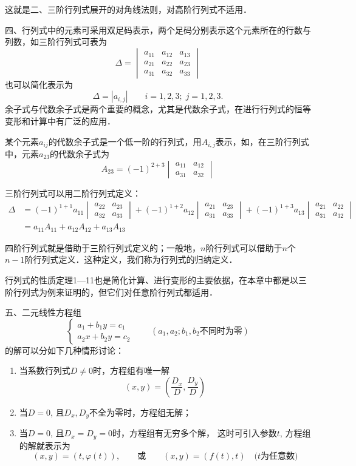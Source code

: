 这就是二、三阶行列式展开的对角线法则，对高阶行列式不适用．

四、行列式中的元素可采用双足码表示，两个足码分别表示这个元素所在的行数与列数，如三阶行列式可表为
\[\Delta =\begin{vmatrix}
    a_{11}&a_{12}&a_{13}\\a_{21}&a_{22}&a_{23}\\a_{31}&a_{32}&a_{33}
\end{vmatrix}\]
也可以简化表示为
\[\Delta =|a_{i,j}|\qquad i=1,2,3;\; j=1,2,3.\]
余子式与代数余子式是两个重要的概念，尤其是代数余子式，在进行行列式的恒等变形和计算中有广泛的应用．

某个元素$a_{ij}$的代数余子式是一个低一阶的行列式，用$A_{i,j}$表示，如，在三阶行列式中，元素$a_{23}$的代数余子式为
\[A_{23}=(-1)^{2+3}\begin{vmatrix}
    a_{11}&a_{12}\\a_{31}&a_{32}
\end{vmatrix}\]

三阶行列式可以用二阶行列式定义：
\[\begin{split}
\Delta&=(-1)^{1+1}a_{11}\begin{vmatrix}
    a_{22}&a_{23}\\a_{32}&a_{33}
\end{vmatrix}+(-1)^{1+2}a_{12}\begin{vmatrix}
    a_{21}&a_{23}\\a_{31}&a_{33}
\end{vmatrix}+(-1)^{1+3}a_{13}\begin{vmatrix}
    a_{21}&a_{22}\\a_{31}&a_{32}
\end{vmatrix}\\
&=a_{11}A_{11}+a_{12}A_{12}+a_{13}A_{13}
\end{split}\]

四阶行列式就是借助于三阶行列式定义的；一般地，$n$阶行列式可以借助于$n$个$n-1$阶行列式定义．这种定义，我们称为行列式的归纳定义．

行列式的性质定理1—11也是简化计算、进行变形的主要依据，在本章中都是以三阶行列式为例来证明的，但它们对任意阶行列式都适用．

五、二元线性方程组
\[\begin{cases}
    a_1+b_1y=c_1\\
    a_2x+b_2y=c_2
\end{cases}\qquad (\text{$a_1,a_2; b_1,b_2$不同时为零})\]
的解可以分如下几种情形讨论：
\begin{enumerate}
    \item 当系数行列式$D\ne 0$时，方程组有唯一解
\[(x,y)=\left(\frac{D_x}{D},\frac{D_y}{D}\right)\]
\item 当$D=0$, 且$D_x,D_y$不全为零时，方程组无解；
\item 当$D=0$, 且$D_x=D_y=0$时，方程组有无穷多个解，
这时可引入参数$t$, 方程组的解就表示为
\[(x,y)=(t,\varphi(t)),\qquad \text{或}\qquad (x,y)=(f(t),t)\quad \text{($t$为任意数)}\]
\end{enumerate}




